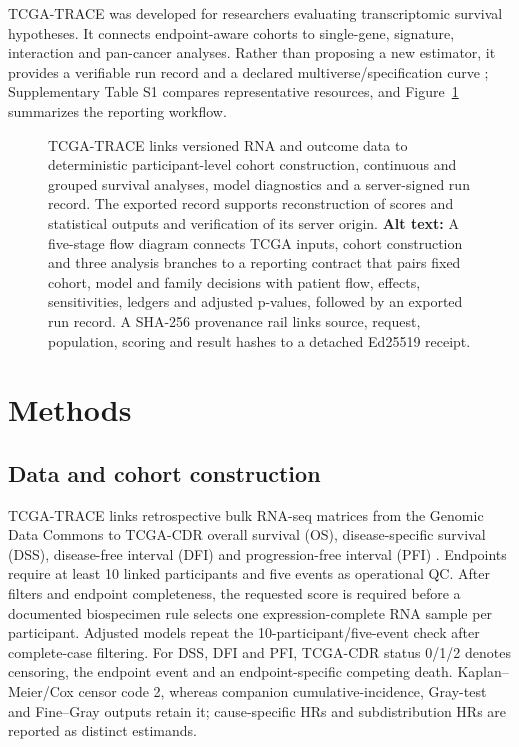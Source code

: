 \documentclass[12pt]{article}
\begin{document}
TCGA-TRACE was developed for researchers evaluating transcriptomic survival
hypotheses. It connects endpoint-aware cohorts to single-gene, signature,
interaction and pan-cancer analyses. Rather than proposing a new estimator, it
provides a verifiable run record and a declared multiverse/specification curve
\citep{steegen2016multiverse,simonsohn2020specification};
Supplementary Table S1 compares representative resources, and
Figure~\ref{fig:trace-workflow} summarizes the reporting workflow.

\begin{figure}[!t]
\centering

\caption{TCGA-TRACE links versioned RNA and outcome data to deterministic
participant-level cohort construction, continuous and grouped survival
analyses, model diagnostics and a server-signed run record. The exported record
supports reconstruction of scores and statistical outputs and verification of
its server origin.
\textbf{Alt text:} A five-stage flow diagram connects TCGA inputs, cohort
construction and three analysis branches to a reporting contract that pairs
fixed cohort, model and family decisions with patient flow, effects,
sensitivities, ledgers and adjusted p-values, followed by an exported run
record. A SHA-256 provenance rail links source, request, population, scoring
and result hashes to a detached Ed25519 receipt.}
\label{fig:trace-workflow}
\end{figure}

\section{Methods}

\subsection{Data and cohort construction}

TCGA-TRACE links retrospective bulk RNA-seq matrices from the Genomic Data
Commons \citep{gdcDataset2026} to TCGA-CDR overall survival (OS),
disease-specific survival (DSS), disease-free interval (DFI) and
progression-free interval (PFI) \citep{liu2018tcga}. Endpoints
require at least 10 linked participants and five events as operational QC.
After filters and endpoint completeness, the requested score is required before
a documented biospecimen rule selects one expression-complete RNA sample per
participant. Adjusted models repeat the 10-participant/five-event check after
complete-case filtering.
For DSS, DFI and PFI, TCGA-CDR status 0/1/2 denotes censoring, the endpoint
event and an endpoint-specific competing death. Kaplan--Meier/Cox censor code
2, whereas companion cumulative-incidence, Gray-test and Fine--Gray outputs
retain it; cause-specific HRs and subdistribution HRs are reported as distinct
estimands.
\end{document}
